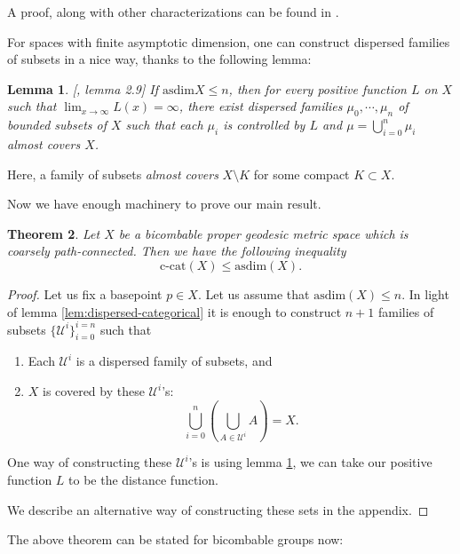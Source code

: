 \documentclass {amsart}
\newcommand {\ccat}     {\text{c-cat}}
\newcommand {\asdim}    {\text{asdim}}
\newcommand {\U}        {\mathcal{U}}
\newtheorem   {theorem}               {Theorem}       [section]
\newtheorem   {lemma}       [theorem] {Lemma}
\theoremstyle {definition}
\begin{document}
A proof, along with other characterizations can be found in
\cite{bellAsymptoticDimension2008}.

For spaces with finite asymptotic dimension, one can construct dispersed
families of subsets in a nice way, thanks to the following lemma:

\begin{lemma} \label{lem:asdim-dispersed-sets}
    [\cite{DRANISHNIKOV1998791}, lemma 2.9]
    If \( \asdim X \leq n \), then for every positive function \( L \) on \( X
    \) such that \( \lim _{x \to \infty} L(x) = \infty \), there exist
    dispersed families \( \mu_0 , \cdots , \mu_n \) of bounded subsets of \(
    X\) such that each \( \mu_i \) is controlled by \( L \) and \( \mu =
    \bigcup _{i=0} ^n \mu _i \) almost covers \( X \).
\end{lemma}
Here, a family of subsets \emph{almost covers} \( X \setminus K \) for some
compact \( K \subset X \).

Now we have enough machinery to prove our main result.
\begin{theorem}
  \label{thm:ccat-asdim}
  Let \( X \) be a bicombable proper geodesic metric space which is coarsely
    path-connected. Then we have the following inequality 
    \[
      \ccat (X) \leq \asdim(X).
  \]
\end{theorem}

\begin{proof}
  Let us fix a basepoint \( p \in X \). Let us assume that \( \asdim (X) \leq n
  \). In light of lemma \ref{lem:dispersed-categorical} it is enough to
  construct \( n+1 \) families of subsets \( \{ \U^i \}_{i=0} ^{i=n} \) such
  that
  \begin{enumerate}
    \item Each \( \U^i \) is a dispersed family of subsets, and
    \item \( X \) is covered by these \( \U^i \)'s:
      \[
        \bigcup _{i=0} ^{n} \left(
          \bigcup _{A \in \U^i} A
        \right) = X.
      \]
  \end{enumerate}

  One way of constructing these \( \U^i \)'s is using lemma
  \ref{lem:asdim-dispersed-sets}, we can take our positive function \( L \) to be the
  distance function.

  We describe an alternative way of constructing these sets in the appendix.
\end{proof}

The above theorem can be stated for bicombable groups now:
\end{document}
